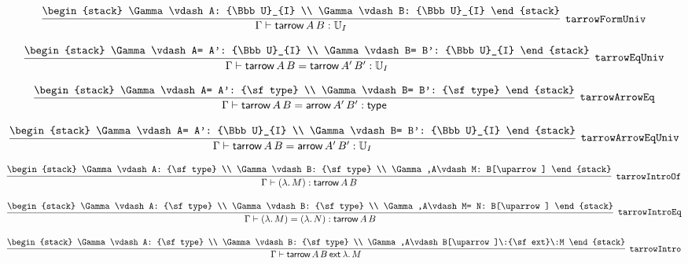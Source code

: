 \[
\infer[{\tt tarrowFormUniv}]{\Gamma \vdash {\sf tarrow}\,A\,B: {\Bbb U}_{I}}{
\begin{stack}
\Gamma \vdash A: {\Bbb U}_{I}
\\
\Gamma \vdash B: {\Bbb U}_{I}
\end{stack}}
\]

\[
\infer[{\tt tarrowEqUniv}]{\Gamma \vdash {\sf tarrow}\,A\,B= {\sf tarrow}\,A'\,B': {\Bbb U}_{I}}{
\begin{stack}
\Gamma \vdash A= A': {\Bbb U}_{I}
\\
\Gamma \vdash B= B': {\Bbb U}_{I}
\end{stack}}
\]

\[
\infer[{\tt tarrowArrowEq}]{\Gamma \vdash {\sf tarrow}\,A\,B= {\sf arrow}\,A'\,B': {\sf type}}{
\begin{stack}
\Gamma \vdash A= A': {\sf type}
\\
\Gamma \vdash B= B': {\sf type}
\end{stack}}
\]

\[
\infer[{\tt tarrowArrowEqUniv}]{\Gamma \vdash {\sf tarrow}\,A\,B= {\sf arrow}\,A'\,B': {\Bbb U}_{I}}{
\begin{stack}
\Gamma \vdash A= A': {\Bbb U}_{I}
\\
\Gamma \vdash B= B': {\Bbb U}_{I}
\end{stack}}
\]

\[
\infer[{\tt tarrowIntroOf}]{\Gamma \vdash (\lambda .\,M): {\sf tarrow}\,A\,B}{
\begin{stack}
\Gamma \vdash A: {\sf type}
\\
\Gamma \vdash B: {\sf type}
\\
\Gamma ,A\vdash M: B[\uparrow ]
\end{stack}}
\]

\[
\infer[{\tt tarrowIntroEq}]{\Gamma \vdash (\lambda .\,M)= (\lambda .\,N): {\sf tarrow}\,A\,B}{
\begin{stack}
\Gamma \vdash A: {\sf type}
\\
\Gamma \vdash B: {\sf type}
\\
\Gamma ,A\vdash M= N: B[\uparrow ]
\end{stack}}
\]

\[
\infer[{\tt tarrowIntro}]{\Gamma \vdash {\sf tarrow}\,A\,B\:{\sf ext}\:\lambda .\,M}{
\begin{stack}
\Gamma \vdash A: {\sf type}
\\
\Gamma \vdash B: {\sf type}
\\
\Gamma ,A\vdash B[\uparrow ]\:{\sf ext}\:M
\end{stack}}
\]

